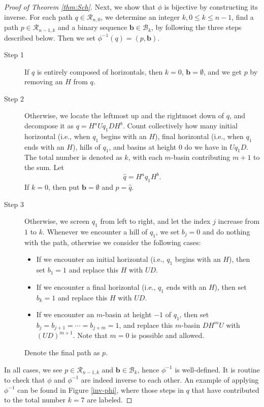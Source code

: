 \documentclass[11pt,reqno]{amsart}
\numberwithin{equation}{section}
\theoremstyle{plain}
\theoremstyle{definition}
\newcommand{\R}{\mathcal{R}}
\newcommand{\B}{\mathcal{B}}
\begin{document}
\begin{proof}[Proof of Theorem \ref{thm:Sch}]
Next, we show that $\phi$ is bijective by constructing its inverse. For each path $q\in\R_{n,0}$, we determine an integer $k, 0\le k\le n-1$, find a path $p\in\R_{n-1,k}$ and a binary sequence $\mathbf{b}\in\B_k$, by following the three steps described below. Then we set $\phi^{-1}(q)=(p,\mathbf{b})$.
\begin{description}
	\item[Step 1] If $q$ is entirely composed of horizontals, then $k=0$, $\mathbf{b}=\emptyset$, and we get $p$ by removing an $H$ from $q$.
	\item[Step 2] Otherwise, we locate the leftmost up and the rightmost down of $q$, and decompose it as $q=H^aUq_1DH^b$. Count collectively how many initial horizontal (i.e., when $q_1$ begins with an $H$), final horizontal (i.e., when $q_1$ ends with an $H$), hills of $q_1$, and basins at height $0$ do we have in $Uq_1D$. The total number is denoted as $k$, with each $m$-basin contributing $m+1$ to the sum. Let $$\hat{q}=H^aq_1H^b.$$ If $k=0$, then put $\mathbf{b}=\emptyset$ and $p=\hat{q}$.
	\item[Step 3] Otherwise, we screen $q_1$ from left to right, and let the index $j$ increase from $1$ to $k$. Whenever we encounter a hill of $q_1$, we set $b_j=0$ and do nothing with the path, otherwise we consider the following cases:
\begin{itemize}
\item If we encounter an initial horizontal (i.e., $q_1$ begins with an $H$), then set $b_1=1$ and replace this $H$ with $UD$.
\item If we encounter a final horizontal (i.e., $q_1$ ends with an $H$), then set $b_k=1$ and replace this $H$ with $UD$.
\item If we encounter an $m$-basin at height $-1$ of $q_1$, then set $b_j=b_{j+1}=\cdots=b_{j+m}=1$, and replace this $m$-basin $DH^mU$ with $(UD)^{m+1}$. Note that $m=0$ is possible and allowed.
\end{itemize}
Denote the final path as $p$.
\end{description}

In all cases, we see $p\in\R_{n-1,k}$ and $\mathbf{b}\in\B_k$, hence $\phi^{-1}$ is well-defined. It is routine to check that $\phi$ and $\phi^{-1}$ are indeed inverse to each other. An example of applying $\phi^{-1}$ can be found in Figure \ref{inv-phi}, where those steps in $q$ that have contributed to the total number $k=7$ are labeled.


\end{proof}
\end{document}
